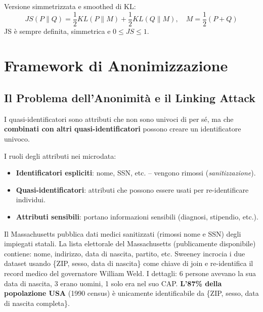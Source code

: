 \documentclass[a4paper,11pt]{article}
\begin{document}
\begin{definizione}
Versione simmetrizzata e smoothed di KL:
\[
JS(P \| Q) = \frac{1}{2}KL(P \| M) + \frac{1}{2}KL(Q \| M), \quad M = \frac{1}{2}(P + Q)
\]
JS \`{e} sempre definita, simmetrica e $0 \leq JS \leq 1$.
\end{definizione}

\section{Framework di Anonimizzazione}

\subsection{Il Problema dell'Anonimit\`{a} e il Linking Attack}

\begin{definizione}
I quasi-identificatori sono attributi che non sono univoci di per s\'{e}, ma che \textbf{combinati con altri quasi-identificatori} possono creare un identificatore univoco.

I ruoli degli attributi nei microdata:
\begin{itemize}
  \item \textbf{Identificatori espliciti}: nome, SSN, etc. -- vengono rimossi (\emph{sanitizzazione}).
  \item \textbf{Quasi-identificatori}: attributi che possono essere usati per re-identificare individui.
  \item \textbf{Attributi sensibili}: portano informazioni sensibili (diagnosi, stipendio, etc.).
\end{itemize}
\end{definizione}

\begin{esempio}
Il Massachusetts pubblica dati medici sanitizzati (rimossi nome e SSN) degli impiegati statali. La lista elettorale del Massachusetts (publicamente disponibile) contiene: nome, indirizzo, data di nascita, partito, etc. Sweeney incrocia i due dataset usando \{ZIP, sesso, data di nascita\} come chiave di join e re-identifica il record medico del governatore William Weld. I dettagli: 6 persone avevano la sua data di nascita, 3 erano uomini, 1 solo era nel suo CAP. \textbf{L'87\% della popolazione USA} (1990 census) \`{e} unicamente identificabile da \{ZIP, sesso, data di nascita completa\}.
\end{esempio}
\end{document}
